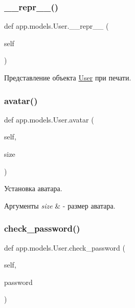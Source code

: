 \subsubsection{\texorpdfstring{\+\_\+\+\_\+repr\+\_\+\+\_\+()}{\_\_repr\_\_()}}
{\footnotesize\ttfamily def app.\+models.\+User.\+\_\+\+\_\+repr\+\_\+\+\_\+ (\begin{DoxyParamCaption}\item[{}]{self }\end{DoxyParamCaption})}



Представление объекта \mbox{\hyperlink{classapp_1_1models_1_1_user}{User}} при печати. 

\mbox{\label{classapp_1_1models_1_1_user_afbfdcc8d14cb2c09cca368406be71764}} 
\subsubsection{\texorpdfstring{avatar()}{avatar()}}
{\footnotesize\ttfamily def app.\+models.\+User.\+avatar (\begin{DoxyParamCaption}\item[{}]{self,  }\item[{}]{size }\end{DoxyParamCaption})}



Установка аватара. 


\begin{DoxyParams}{Аргументы}
{\em size} & -\/ размер аватара. \\
\hline
\end{DoxyParams}
\mbox{\label{classapp_1_1models_1_1_user_ab75430896da76337b5eb18763f2a18c3}} 
\subsubsection{\texorpdfstring{check\+\_\+password()}{check\_password()}}
{\footnotesize\ttfamily def app.\+models.\+User.\+check\+\_\+password (\begin{DoxyParamCaption}\item[{}]{self,  }\item[{}]{password }\end{DoxyParamCaption})}




